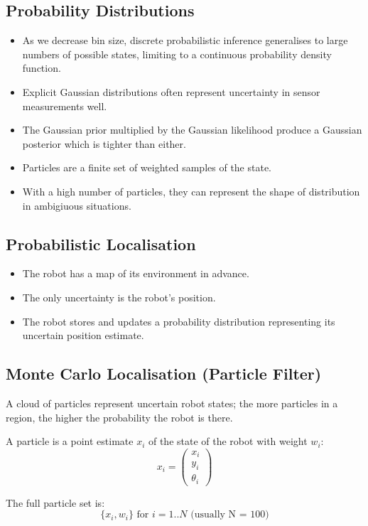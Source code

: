 \documentclass[11pt]{article}
\begin{document}
\subsection{Probability Distributions}
\begin{itemize}
  \item As we decrease bin size, discrete probabilistic inference generalises to large numbers of possible states, limiting to a continuous probability density function.
  \item Explicit Gaussian distributions often represent uncertainty in sensor measurements well.
  \item The Gaussian prior multiplied by the Gaussian likelihood produce a Gaussian posterior which is tighter than either.
  \item Particles are a finite set of weighted samples of the state.
  \item With a high number of particles, they can represent the shape of distribution in ambigiuous situations.
\end{itemize}

\subsection{Probabilistic Localisation}
\begin{itemize}
  \item The robot has a map of its environment in advance.
  \item The only uncertainty is the robot's position.
  \item The robot stores and updates a probability distribution representing its uncertain position estimate.
\end{itemize}

\subsection{Monte Carlo Localisation (Particle Filter)}
A cloud of particles represent uncertain robot states; the more particles in a region, the higher the probability the robot is there.

A particle is a point estimate $x_i$ of the state of the robot with weight $w_i$:
\[
  x_i = 
  \begin{pmatrix}
    x_i \\
    y_i \\
    \theta_i
  \end{pmatrix}
\]

The full particle set is:
\[
  \{ x_i, w_i \} \text{ for } i = 1..N \text{ (usually N = 100)}
\]
\end{document}
